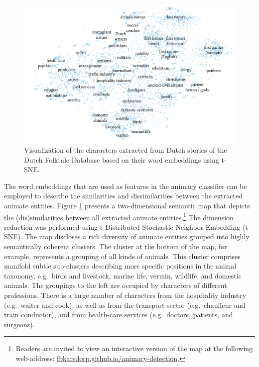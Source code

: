 \begin{figure}
\centering
\includegraphics[width=\textwidth]{images/character-map.pdf}
\caption{Visualization of the characters extracted from Dutch stories of the Dutch Folktale Database based on their word embeddings using t-SNE.}
\label{fig:animacy-character-map}
\end{figure}

The word embeddings that are used as features in the animacy classifier can be employed to describe the similarities and dissimilarities between the extracted animate entities. Figure \ref{fig:animacy-character-map} presents a two-dimensional semantic map that depicts the (dis)similarities between all extracted animate entities.\footnote{Readers are invited to view an interactive version of the map at the following web-address: \url{fbkarsdorp.github.io/animacy-detection}.} The dimension reduction was performed using t-Distributed Stochastic Neighbor Embedding (t-SNE)\autocite{maaten:2008}. The map discloses a rich diversity of animate entities grouped into highly semantically coherent clusters. The cluster at the bottom of the map, for example, represents a grouping of all kinds of animals. This cluster comprises manifold subtle sub-clusters describing more specific positions in the animal taxonomy, e.g.\ birds and livestock, marine life, vermin, wildlife, and domestic animals. The groupings to the left are occupied by characters of different professions. There is a large number of characters from the hospitality industry (e.g.\ waiter and cook), as well as from the transport sector (e.g.\ chauffeur and train conductor), and from health-care services (e.g.\ doctors, patients, and surgeons).

